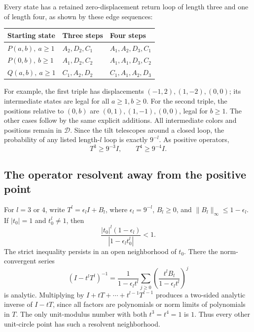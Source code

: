 \documentclass[11pt,letterpaper]{article}
\theoremstyle{remark}\newtheorem{remark}[theorem]{Remark}
\newcommand{\1}{\mathbf1}
\begin{document}
Every state has a retained zero-displacement return loop of length three
and one of length four, as shown by these edge sequences:
\begin{center}
\begin{tabular}{@{}lll@{}}\toprule
Starting state & Three steps & Four steps\\\midrule
$P(a,b),\ a\ge1$ & $A_2,D_2,C_1$ & $A_1,A_2,D_3,C_1$\\
$P(0,b),\ b\ge1$ & $A_1,D_2,C_2$ & $A_1,A_1,D_3,C_2$\\
$Q(a,b),\ a\ge1$ & $C_1,A_2,D_2$ & $C_1,A_1,A_2,D_3$\\\bottomrule
\end{tabular}
\end{center}
For example, the first triple has displacements $(-1,2),(1,-2),(0,0)$;
its intermediate states are legal for all $a\ge1,b\ge0$. For the second
triple, the positions relative to $(0,b)$ are $(0,1),(1,-1),(0,0)$,
legal for $b\ge1$. The other cases follow by the same explicit additions.
All intermediate colors and positions remain in $\mathcal D$.
Since the tilt telescopes around a closed loop, the probability of any
listed length-$l$ loop is exactly $9^{-l}$. As positive operators,
\begin{equation}\label{icw:eq:loops}
 T^3\ge9^{-3}I,\qquad T^4\ge9^{-4}I.
\end{equation}

\subsection{The operator resolvent away from the positive point}
For $l=3$ or $4$, write $T^l=\epsilon_lI+B_l$, where
$\epsilon_l=9^{-l}$, $B_l\ge0$, and
$\|B_l\|_\infty\le1-\epsilon_l$. If $|t_0|=1$ and $t_0^l\ne1$, then
\[
 \frac{|t_0|^l(1-\epsilon_l)}{|1-\epsilon_lt_0^l|}<1.
\]
The strict inequality persists in an open neighborhood of $t_0$.
There the norm-convergent series
\begin{equation}\label{icw:eq:resolvent}
 (I-t^lT^l)^{-1}
  =\frac1{1-\epsilon_lt^l}\sum_{j\ge0}
       \left(\frac{t^lB_l}{1-\epsilon_lt^l}\right)^j
\end{equation}
is analytic. Multiplying by $I+tT+\cdots+t^{l-1}T^{l-1}$ produces a
two-sided analytic inverse of $I-tT$, since all factors are polynomials
or norm limits of polynomials in $T$. The only unit-modulus number with
both $t^3=t^4=1$ is $1$. Thus every other unit-circle point has such a
resolvent neighborhood.
\end{document}
